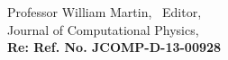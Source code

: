 \begin{letter}{Professor William Martin, \  Editor,\\
    Journal of Computational Physics,\\
\textbf{Re: Ref. No. JCOMP-D-13-00928}}
%
%


\end{letter}
